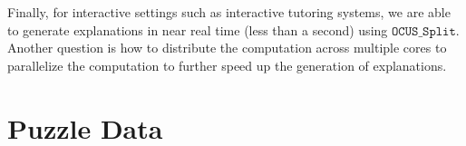 \documentclass[twoside,11pt]{article}
\newcommand\mm[1]{\ensuremath{#1}\xspace}
\newcommand\call[1]{\mm{\texttt{#1}}}
\newcommand{\comussplit}{\mm{\call{OCUS\_Split}}}
\begin{document}
Finally, for interactive settings such as interactive tutoring systems, we are able to generate explanations in near real time (less than a second) using \comussplit. Another question is how to distribute the computation across multiple cores to parallelize the computation to further speed up the generation of explanations.


\appendix
\newpage
\section{Puzzle Data}\label{apx:puzzledata}
\end{document}
